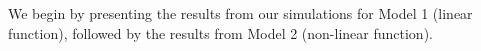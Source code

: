 \documentclass{article}
\begin{document}

	
	We begin by presenting the results from our simulations for Model 1 (linear function), followed by the results from Model 2 (non-linear function).
	

\end{document}
